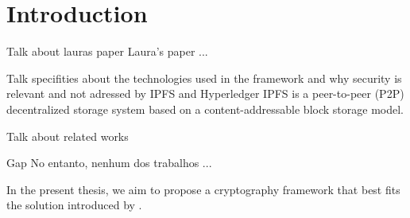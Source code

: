 \documentclass[cic,tc,english]{iiufrgs}
\begin{document}
\tableofcontents

\clearpage
{}

\chapter{Introduction}
    \label{chap:introduction}
    \begin{draft}{Talk about lauras paper}
        Laura's paper ...
    \end{draft}


    \begin{draft}{Talk specifities about the technologies used in the framework and why security is relevant and not adressed by IPFS and Hyperledger}
        IPFS \cite{benet2013ipfs} is a peer-to-peer (P2P) decentralized storage system based on a content-addressable block storage model.
    \end{draft}

    \begin{draft}{Talk about related works}
        
    \end{draft}

    \begin{draft}{Gap}
        No entanto, nenhum dos trabalhos ...
    \end{draft}


    In the present thesis, we aim to propose a cryptography framework that best fits the solution introduced by \citet{laura2023}.

\end{document}
